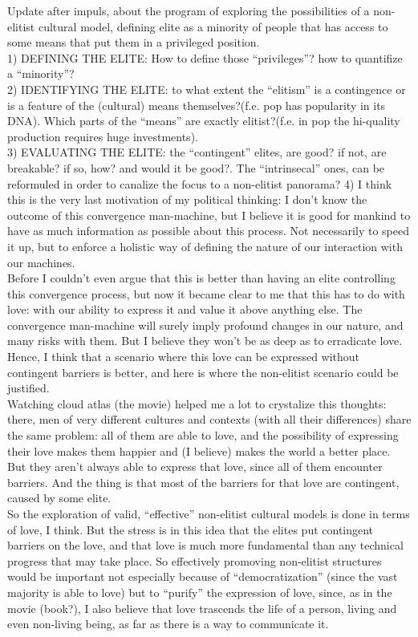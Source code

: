 \documentclass[11pt]{scrartcl} %
\begin{document}
Update after impuls, about the program of exploring the possibilities of a non-elitist cultural model, defining elite as a minority of people that has access to some means that put them in a privileged position.\\
1) DEFINING THE ELITE: How to define those ``privileges''? how to quantifize a ``minority''?\\
2) IDENTIFYING THE ELITE: to what extent the ``elitism'' is a contingence or is a feature of the (cultural) means themselves?(f.e. pop has popularity in its DNA). Which parts of the ``means'' are exactly elitist?(f.e. in pop the hi-quality production requires huge investments).\\
3) EVALUATING THE ELITE: the ``contingent'' elites, are good? if not, are breakable? if so, how? and would it be good?.  The ``intrinsecal'' ones, can be reformuled in order to canalize the focus to a non-elitist panorama?
4)
I think this is the very last motivation of my political thinking: I don't know the outcome of this convergence man-machine, but I believe it is good for mankind to have as much information as possible about this process. Not necessarily to speed it up, but to enforce a holistic way of defining the nature of our interaction with our machines.\\

Before I couldn't even argue that this is better than having an elite controlling this convergence process, but now it became clear to me that this has to do with love: with our ability to express it and value it above anything else. The convergence man-machine will surely imply profound changes in our nature, and many risks with them. But I believe they won't be as deep as to erradicate love. Hence, I think that a scenario where this love can be expressed without contingent barriers is better, and here is where the non-elitist scenario could be justified.\\
Watching cloud atlas (the movie) helped me a lot to crystalize this thoughts: there, men of very different cultures and contexts (with all their differences) share the same problem: all of them are able to love, and the possibility of expressing their love makes them happier and (I believe) makes the world a better place. But they aren't always able to express that love, since all of them encounter barriers. And the thing is that most of the barriers for that love are contingent, caused by some elite.\\
So the exploration of valid, ``effective'' non-elitist cultural models is done in terms of love, I think. But the stress is in this idea that the elites put contingent barriers on the love, and that love is much more fundamental than any technical progress that may take place. So effectively promoving non-elitist structures would be important not especially because of ``democratization'' (since the vast majority is able to love) but to ``purify'' the expression of love, since, as in the movie (book?), I also believe that love trascends the life of a person, living and even non-living being, as far as there is a way to communicate it.\\
\end{document}
